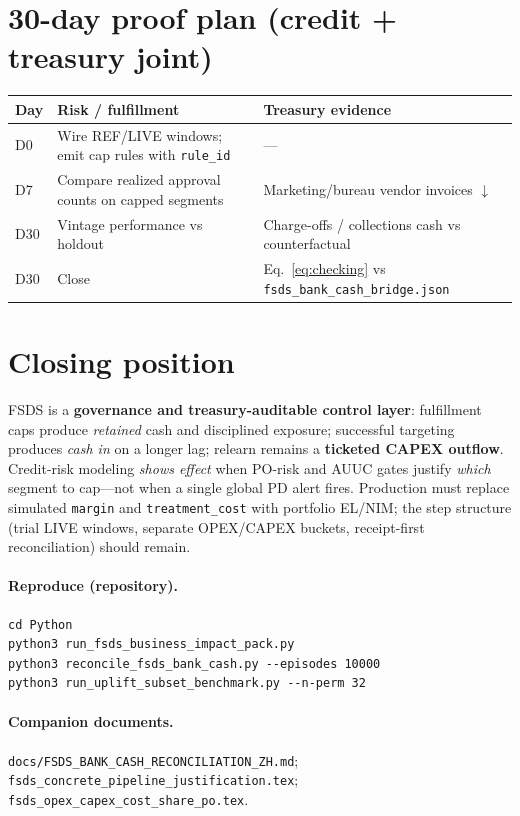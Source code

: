 \documentclass[11pt]{article}
\begin{document}
\section{30-day proof plan (credit + treasury joint)}
\begin{longtable}{@{}p{}p{}p{}@{}}
\toprule
Day & Risk / fulfillment & Treasury evidence \\
\midrule
\endhead
D0 & Wire REF/LIVE windows; emit cap rules with \texttt{rule\_id} & --- \\
D7 & Compare realized approval counts on capped segments & Marketing/bureau vendor invoices $\downarrow$ \\
D30 & Vintage performance vs holdout & Charge-offs / collections cash vs counterfactual \\
D30 & Close & Eq.~\eqref{eq:checking} vs \texttt{fsds\_bank\_cash\_bridge.json} \\
\bottomrule
\end{longtable}

\section{Closing position}
FSDS is a \textbf{governance and treasury-auditable control layer}: fulfillment caps produce \emph{retained} cash and disciplined exposure; successful targeting produces \emph{cash in} on a longer lag; relearn remains a \textbf{ticketed CAPEX outflow}.
Credit-risk modeling \emph{shows effect} when PO-risk and AUUC gates justify \emph{which} segment to cap---not when a single global PD alert fires.
Production must replace simulated \texttt{margin} and \texttt{treatment\_cost} with portfolio EL/NIM; the step structure (trial LIVE windows, separate OPEX/CAPEX buckets, receipt-first reconciliation) should remain.

\paragraph{Reproduce (repository).}
\begin{verbatim}
cd Python
python3 run_fsds_business_impact_pack.py
python3 reconcile_fsds_bank_cash.py --episodes 10000
python3 run_uplift_subset_benchmark.py --n-perm 32
\end{verbatim}

\paragraph{Companion documents.}
\texttt{docs/FSDS\_BANK\_CASH\_RECONCILIATION\_ZH.md};
\texttt{fsds\_concrete\_pipeline\_justification.tex};
\texttt{fsds\_opex\_capex\_cost\_share\_po.tex}.
\end{document}
